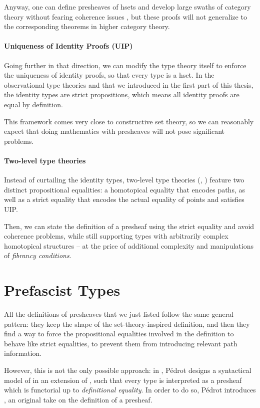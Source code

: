 Anyway, one can define presheaves of hsets and develop large swaths of category
theory without fearing coherence issues , but these proofs
will not generalize to the corresponding theorems in higher category theory.

\paragraph{Uniqueness of Identity Proofs (UIP)}
% 
Going further in that direction, we can modify the type theory itself to 
enforce the uniqueness of identity proofs, so that every type is a hset.
% 
In the observational type theories \SetoidTT and \SetoidCC that we introduced 
in the first part of this thesis, the identity types are strict propositions,
which means all identity proofs are equal by definition.

This framework comes very close to constructive set theory, so we can
reasonably expect that doing mathematics with presheaves will not pose 
significant problems.

\paragraph{Two-level type theories}
% 
Instead of curtailing the identity types, two-level type theories 
(, )
feature two distinct propositional equalities: a homotopical equality that 
encodes paths, as well as a strict equality that encodes the actual equality
of points and satisfies UIP.

Then, we can state the definition of a presheaf using the strict equality
and avoid coherence problems, while still supporting types with arbitrarily
complex homotopical structures -- at the price of additional complexity
and manipulations of \emph{fibrancy conditions}.

\section{Prefascist Types}

All the definitions of presheaves that we just listed follow the same general
pattern: they keep the shape of the set-theory-inspired definition, and
then they find a way to force the propositional equalities involved in the
definition to behave like strict equalities, \ie to prevent them from 
introducing relevant path information. 

However, this is not the only possible approach: 
% 
in , Pédrot designs a syntactical model of \CIC in
an extension of \CIC, such that every type is interpreted as a presheaf which
is functorial up to \emph{definitional equality}. 
% 
In order to do so, Pédrot introduces , an original
take on the definition of a presheaf.

